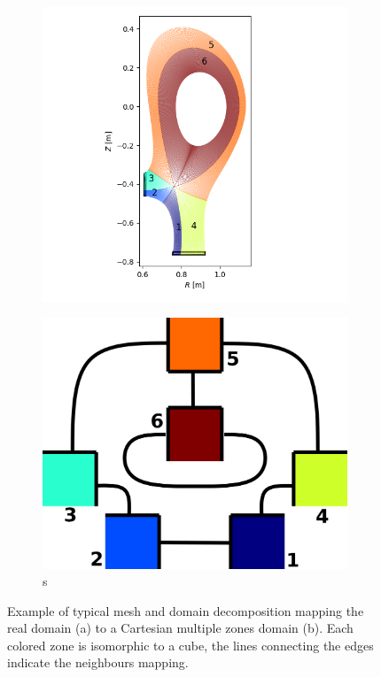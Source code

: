 \begin{figure}[H]\centering
	\begin{subfigure}[t]{0.5\textwidth}
		\centering
		\includegraphics[width=1\textwidth]{schemes/TCVmesh.png}
		\label{fig:TCVmesh}
	\end{subfigure}
	\begin{subfigure}[t]{0.3\textwidth}
		\centering
		\includegraphics[width=1\textwidth]{schemes/TCV_domains.png}s
		\label{fig:TCV_domains}
	\end{subfigure}
	
	\caption{ Example of typical mesh and domain decomposition mapping the real domain (a) to a Cartesian multiple zones domain (b). Each colored zone is isomorphic to a cube, the lines connecting the edges indicate the neighbours mapping. }
	\label{fig:TCVzoneDecomposition}
\end{figure}

